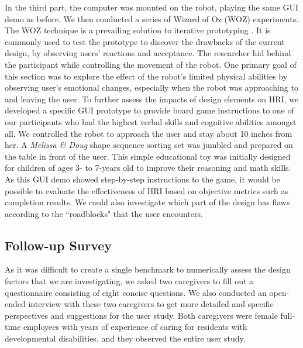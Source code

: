 \documentclass[letterpaper, 10 pt, conference]{ieeeconf}  %
\begin{document}
In the third part, the computer was mounted on the robot, playing the same GUI demo as before. We then conducted a series of Wizard of Oz (WOZ) experiments. The WOZ technique is a prevailing solution to iterative prototyping \cite{McTear2016}. It is commonly used to test the prototype to discover the drawbacks of the current design, by observing users' reactions and acceptance. The researcher hid behind the participant while controlling the movement of the robot. One primary goal of this section was to explore the effect of the robot's limited physical abilities by observing user's emotional changes, especially when the robot was approaching to and leaving the user. To further assess the impacts of design elements on HRI, we developed a specific GUI prototype to provide board game instructions to one of our participants who had the highest verbal skills and cognitive abilities amongst all. We controlled the robot to approach the user and stay about 10 inches from her. A \textit{Melissa \& Doug} shape sequence sorting set was jumbled and prepared on the table in front of the user. This simple educational toy was initially designed for children of ages 3- to 7-years old to improve their reasoning and math skills. As this GUI demo showed step-by-step instructions to the game, it would be possible to evaluate the effectiveness of HRI based on objective metrics such as completion results. We could also investigate which part of the design has flaws according to the ``roadblocks" that the user encounters.  


\subsection{Follow-up Survey}

As it was difficult to create a single benchmark to numerically assess the design factors that we are investigating, we asked two caregivers to fill out a questionnaire consisting of eight concise questions. We also conducted an open-ended interview with these two caregivers to get more detailed and specific perspectives and suggestions for the user study. Both caregivers were female full-time employees with years of experience of caring for residents with developmental disabilities, and they observed the entire user study.
\end{document}
